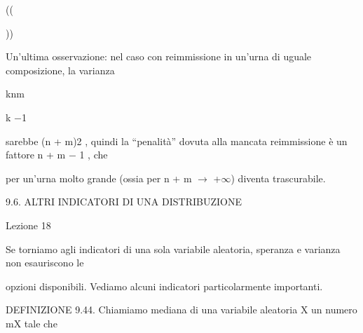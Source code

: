 \documentclass[a4paper,portrait,12pt]{article}
\begin{document}
((





))





\begin{flushleft}
Un'ultima osservazione: nel caso con reimmissione in un'urna di uguale composizione, la varianza
\end{flushleft}


\begin{flushleft}
knm
\end{flushleft}


\begin{flushleft}
k $-$1
\end{flushleft}


\begin{flushleft}
sarebbe (n + m)2 , quindi la {``}penalit\`{a}'' dovuta alla mancata reimmissione \`{e} un fattore n + m $-$ 1 , che
\end{flushleft}


\begin{flushleft}
per un'urna molto grande (ossia per n + m $\rightarrow$ +$\infty$) diventa trascurabile.
\end{flushleft}





\begin{flushleft}
9.6. ALTRI INDICATORI DI UNA DISTRIBUZIONE
\end{flushleft}





\begin{flushleft}
Lezione 18
\end{flushleft}





\begin{flushleft}
Se torniamo agli indicatori di una sola variabile aleatoria, speranza e varianza non esauriscono le
\end{flushleft}


\begin{flushleft}
opzioni disponibili. Vediamo alcuni indicatori particolarmente importanti.
\end{flushleft}


\begin{flushleft}
DEFINIZIONE 9.44. Chiamiamo mediana di una variabile aleatoria X un numero mX tale che
\end{flushleft}
\end{document}
